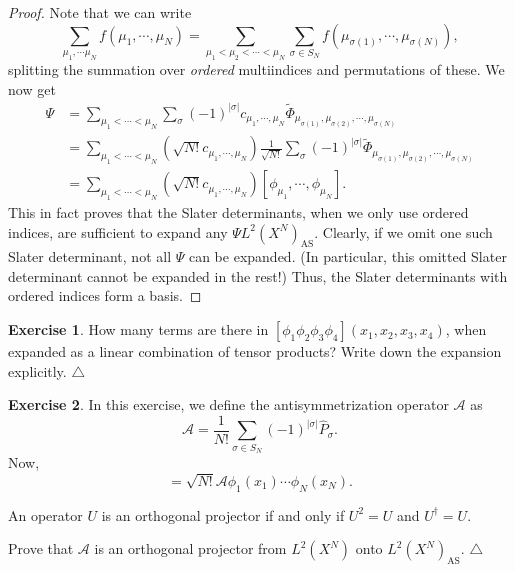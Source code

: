\documentclass{report}
\theoremstyle{plain}
\theoremstyle{definition}
\newtheorem{exerc}{Exercise}[chapter]
\newcommand\xqed[1]{%
  \leavevmode\unskip\penalty9999 \hbox{}\nobreak\hfill
  \quad\hbox{#1}}
\newcommand\demo{\xqed{$\triangle$}}
\newenvironment{exercise}{\bigskip\begin{exerc}}{\demo\end{exerc}\bigskip}
\begin{document}
\begin{proof}
Note that we can write
\begin{equation}
  \sum_{\mu_1,\cdots\mu_N} f(\mu_1,\cdots,\mu_N) = \sum_{\mu_1<\mu_2<\cdots<\mu_N}
  \sum_{\sigma\in S_N} f(\mu_{\sigma(1)},\cdots,\mu_{\sigma(N)}),
\end{equation}
splitting the summation over \emph{ordered} multiindices and
permutations of these. We now get
\begin{equation}
  \begin{split}
    \Psi &= \sum_{\mu_1<\cdots<\mu_N} \sum_\sigma (-1)^{|\sigma|}
    c_{\mu_1,\cdots,\mu_N}
    \tilde{\Phi}_{\mu_{\sigma(1)},\mu_{\sigma(2)},\cdots,\mu_{\sigma(N)}} \\
    &=\sum_{\mu_1<\cdots<\mu_N} (\sqrt{N!} c_{\mu_1,\cdots,\mu_N})
    \frac{1}{\sqrt{N!}} \sum_\sigma (-1)^{|\sigma|}
    \tilde{\Phi}_{\mu_{\sigma(1)},\mu_{\sigma(2)},\cdots,\mu_{\sigma(N)}} \\
    &= \sum_{\mu_1<\cdots<\mu_N} (\sqrt{N!} c_{\mu_1,\cdots,\mu_N})
    [\phi_{\mu_1},\cdots,\phi_{\mu_N}].
  \end{split}
\end{equation}
This in fact proves that the Slater determinants, when we only use
ordered indices, are sufficient to expand any $\Psi
L^2(X^N)_\text{AS}$. Clearly, if we omit one such Slater determinant,
not all $\Psi$ can be expanded. (In particular, this omitted Slater
determinant cannot be expanded in the rest!) Thus, the Slater
determinants with ordered indices form a basis.
\end{proof}

\begin{exercise}
  How many terms are there in
  $[\phi_1\phi_2\phi_3\phi_4](x_1,x_2,x_3,x_4)$, when expanded as a
  linear combination of tensor products? Write down the expansion
  explicitly.
\end{exercise}



\begin{exercise}

  In this exercise, we define the antisymmetrization operator $\mathscr{A}$ as
  \begin{equation}
    \mathscr{A} = \frac{1}{N!} \sum_{\sigma \in S_N} (-1)^{|\sigma|}
    \hat{P}_\sigma.\label{eq:antisym}
  \end{equation}
  Now,
  \begin{equation}
    [\phi_1,\cdots,\phi_N] = \sqrt{N!} \mathscr{A} \phi_1(x_1)\cdots\phi_N(x_N).
  \end{equation}

  An operator $U$ is an orthogonal projector if and only if $U^2=U$
  and $U^\dag = U$.

  Prove that $\mathscr{A}$ is an orthogonal projector from $L^2(X^N)$
  onto $L^2(X^N)_\text{AS}$.
\end{exercise}
\end{document}
